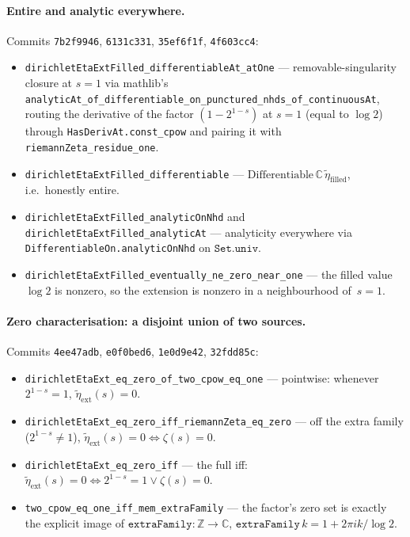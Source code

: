 \paragraph{Entire and analytic everywhere.}
Commits \texttt{7b2f9946}, \texttt{6131c331}, \texttt{35ef6f1f},
\texttt{4f603cc4}:
\begin{itemize}
\item \texttt{dirichletEtaExtFilled\_differentiableAt\_atOne}
  --- removable-singularity closure at $s = 1$ via mathlib's
  \texttt{analyticAt\_of\_differentiable\_on\_punctured\_nhds\_of\_continuousAt},
  routing the derivative of the factor $(1 - 2^{1-s})$ at $s = 1$
  (equal to $\log 2$) through \texttt{HasDerivAt.const\_cpow} and
  pairing it with \texttt{riemannZeta\_residue\_one}.
\item \texttt{dirichletEtaExtFilled\_differentiable} ---
  $\mathrm{Differentiable}\,\mathbb{C}\,\widetilde{\eta}_{\mathrm{filled}}$,
  i.e.\ honestly entire.
\item \texttt{dirichletEtaExtFilled\_analyticOnNhd} and
  \texttt{dirichletEtaExtFilled\_analyticAt} --- analyticity
  everywhere via \texttt{DifferentiableOn.analyticOnNhd} on
  $\mathtt{Set.univ}$.
\item \texttt{dirichletEtaExtFilled\_eventually\_ne\_zero\_near\_one}
  --- the filled value $\log 2$ is nonzero, so the extension is
  nonzero in a neighbourhood of~$s = 1$.
\end{itemize}

\paragraph{Zero characterisation: a disjoint union of two sources.}
Commits \texttt{4ee47adb}, \texttt{e0f0bed6}, \texttt{1e0d9e42},
\texttt{32fdd85c}:
\begin{itemize}
\item \texttt{dirichletEtaExt\_eq\_zero\_of\_two\_cpow\_eq\_one} ---
  pointwise: whenever $2^{1-s} = 1$, $\widetilde{\eta}_{\mathrm{ext}}(s) = 0$.
\item \texttt{dirichletEtaExt\_eq\_zero\_iff\_riemannZeta\_eq\_zero}
  --- off the extra family ($2^{1-s} \ne 1$),
  $\widetilde{\eta}_{\mathrm{ext}}(s) = 0 \Longleftrightarrow \zeta(s) = 0$.
\item \texttt{dirichletEtaExt\_eq\_zero\_iff} --- the full iff:
  $\widetilde{\eta}_{\mathrm{ext}}(s) = 0 \iff 2^{1-s} = 1 \lor \zeta(s) = 0$.
\item \texttt{two\_cpow\_eq\_one\_iff\_mem\_extraFamily} --- the
  factor's zero set is exactly the explicit image of
  $\mathtt{extraFamily} : \mathbb{Z} \to \mathbb{C}$,
  $\mathtt{extraFamily}\,k = 1 + 2\pi i k / \log 2$.
\end{itemize}

